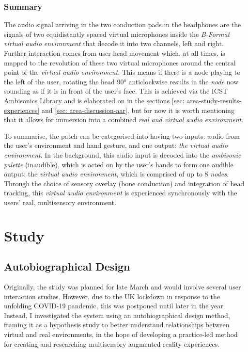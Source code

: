 \subsubsection{Summary}                         \label{sec: area-system-software-summary}
The audio signal arriving in the two conduction pads in the headphones are the signals of two equidistantly spaced virtual microphones inside the \textit{B-Format virtual audio environment} that decode it into two channels, left and right. Further interaction comes from user head movement which, at all times, is mapped to the revolution of these two virtual microphones around the central point of the \textit{virtual audio environment}. This means if there is a node playing to the left of the user, rotating the head 90° anticlockwise results in the \textit{node} now sounding as if it is in front of the user’s face. This is achieved via the ICST Ambisonics Library \citep{schacher2006} and is elaborated on in the sections \autoref{sec: area-study-results-experiences} and \autoref{sec: area-discussion-aar}, but for now it is worth mentioning that it allows for immersion into a combined \textit{real and virtual audio environment}.

To summarise, the patch can be categorised into having two inputs: audio from the user’s environment and hand gesture, and one output: \textit{the virtual audio environment}. In the background, this audio input is decoded into the \textit{ambisonic palette} (inaudible), which is acted on by the user’s hands to form one audible output: the \textit{virtual audio environment}, which is comprised of up to 8 \textit{nodes}. Through the choice of sensory overlay (bone conduction) and integration of head tracking, this \textit{virtual audio environment} is experienced synchronously with the users’ real, multisensory environment. 



\section{Study}                                 \label{sec: area-study}
\subsection{Autobiographical Design}            \label{sec: area-study-abd}
Originally, the study was planned for late March and would involve several user interaction studies. However, due to the UK lockdown in response to the unfolding COVID-19 pandemic, this was postponed until later in the year. Instead, I investigated the system using an autobiographical design method, framing it as a hypothesis study to better understand relationships between virtual and real environments, in the hope of developing a practice-led method for creating and researching multisensory augmented reality experiences. 

